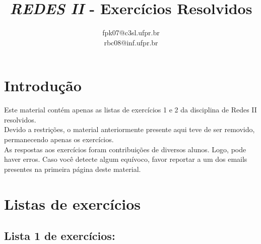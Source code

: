 \documentclass{article}
\title{\textit{REDES II} - Exercícios Resolvidos}
\author{fpk07@c3sl.ufpr.br\\rbc08@inf.ufpr.br}
\begin{document}
\maketitle

\tableofcontents

\newpage

\section{Introdução}


Este material contém apenas as listas de exercícios 1 e 2 da disciplina de Redes
II resolvidos.\\

Devido a restrições, o material anteriormente presente aqui teve de ser
removido, permanecendo apenas os exercícios.\\

As respostas aos exercícios foram contribuições de diversos alunos. Logo, pode
haver erros. Caso você detecte algum equívoco, favor reportar a um dos emails
presentes na primeira página deste material.\\



\section{Listas de exercícios}

\subsection{Lista 1 de exercícios:}
\end{document}
